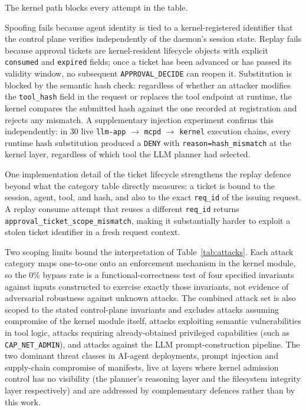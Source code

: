 The kernel path blocks every attempt in the table.

Spoofing fails because agent identity is tied to a kernel-registered identifier that the control plane verifies independently of the daemon's session state.
Replay fails because approval tickets are kernel-resident lifecycle objects with explicit \texttt{consumed} and \texttt{expired} fields; once a ticket has been advanced or has passed its validity window, no subsequent \texttt{APPROVAL\_\allowbreak DECIDE} can reopen it.
Substitution is blocked by the semantic hash check: regardless of whether an attacker modifies the \texttt{tool\_hash} field in the request or replaces the tool endpoint at runtime, the kernel compares the submitted hash against the one recorded at registration and rejects any mismatch.
A supplementary injection experiment confirms this independently: in 30 live \texttt{llm-app} $\to$ \texttt{mcpd} $\to$ \texttt{kernel} execution chains, every runtime hash substitution produced a \texttt{DENY} with \texttt{reason=hash\_\allowbreak mismatch} at the kernel layer, regardless of which tool the LLM planner had selected.

One implementation detail of the ticket lifecycle strengthens the replay defence beyond what the category table directly measures: a ticket is bound to the session, agent, tool, and hash, and also to the exact \texttt{req\_id} of the issuing request.
A replay consume attempt that reuses a different \texttt{req\_id} returns \texttt{approval\_\allowbreak ticket\_\allowbreak scope\_\allowbreak mismatch}, making it substantially harder to exploit a stolen ticket identifier in a fresh request context.

Two scoping limits bound the interpretation of Table~\ref{tab:attacks}. Each attack category maps one-to-one onto an enforcement mechanism in the kernel module, so the 0\% bypass rate is a functional-correctness test of four specified invariants against inputs constructed to exercise exactly those invariants, not evidence of adversarial robustness against unknown attacks. The combined attack set is also scoped to the stated control-plane invariants and excludes attacks assuming compromise of the kernel module itself, attacks exploiting semantic vulnerabilities in tool logic, attacks requiring already-obtained privileged capabilities (such as \texttt{CAP\_\allowbreak NET\_\allowbreak ADMIN}), and attacks against the LLM prompt-construction pipeline. The two dominant threat classes in AI-agent deployments, prompt injection \cite{greshake2023prompt, liu2023prompt} and supply-chain compromise of manifests, live at layers where kernel admission control has no visibility (the planner's reasoning layer and the filesystem integrity layer respectively) and are addressed by complementary defences rather than by this work.



